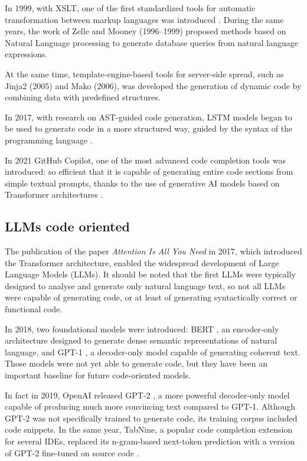 In 1999, with XSLT, one of the first standardized tools for 
automatic transformation between markup languages was introduced 
\cite{xslt1999}. During the same years, the work of Zelle\cite{zelle1996learning}
and  Mooney\cite{mooney1997nlidb} (1996–1999) 
proposed methods based on Natural Language 
processing to generate database queries from natural language 
expressions.

At the same time, template-engine-based tools  for server-side 
spread, such as Jinja2 (2005)\cite{jinja2docs} 
and Mako (2006)\cite{makoengine}, 
was developed the generation of 
dynamic code by combining data with predefined structures. 

In 2017, with research on AST-guided code generation, LSTM 
models began to be used to generate code in a more structured 
way, guided by the syntax of the programming language 
\cite{yin2017syntactic}.

In 2021 GitHub Copilot, one of the most advanced 
code completion tools was introduced: so efficient that it is 
capable of generating entire code sections from simple textual 
prompts, thanks to the use of generative AI models based on 
Transformer architectures \cite{chen2021codex}.




\subsection{LLMs code oriented} %
The publication of the 
paper \textit{Attention Is All You Need} \cite{vaswani2017attention} 
in 2017, which 
introduced the Transformer architecture, 
enabled the widespread development of
Large Language Models (LLMs). 
It should be noted that the first LLMs were typically designed 
to analyse and generate only natural language text, so not all LLMs 
were capable of generating code, or at least of generating syntactically 
correct or functional code.

In 2018, two foundational models were introduced: BERT 
\cite{devlin2019bert}, an encoder-only architecture 
designed to generate dense semantic representations of 
natural language, and GPT-1 \cite{radford2018improving}, 
a decoder-only model capable of generating coherent text. 
Those models were not yet able to generate code, but they have been 
an important baseline for future code-oriented models.

In fact in 2019, OpenAI released GPT-2 \cite{radford2019language}, 
a more powerful decoder-only model capable of producing much 
more convincing text compared to GPT-1. Although GPT-2 was 
not specifically trained to generate code, its training 
corpus included code snippets. In the same year, 
TabNine, a popular code completion extension for several IDEs, 
replaced its n-gram-based next-token prediction with a version 
of GPT-2 fine-tuned on source code \cite{tabnine2019}.

